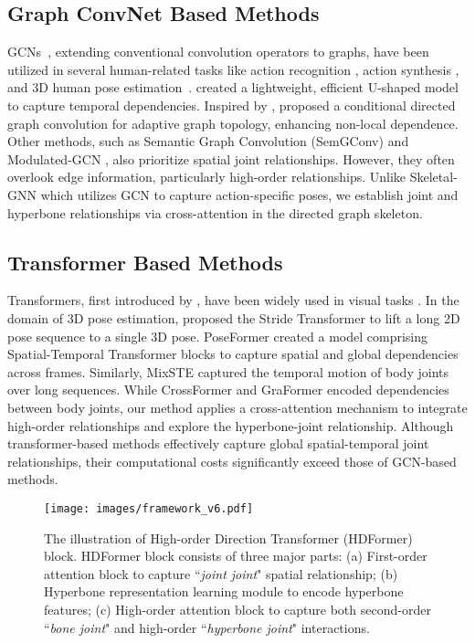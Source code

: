 \documentclass{article}
\begin{document}
\subsection{Graph ConvNet Based Methods}
GCNs~\cite{scarselli2008graph,gilmer2017neural}, extending conventional convolution operators to graphs, have been utilized in several human-related tasks like action recognition \cite{shi2019skeleton,shi2019-twostream,xiang2022language}, action synthesis \cite{yan2019convolutional}, and 3D human pose estimation~\cite{zhou2022hypergraph}. \cite{wang2020-motion} created a lightweight, efficient U-shaped model to capture temporal dependencies. Inspired by \cite{shi2019skeleton}, \cite{hu(2021)-conditional} proposed a conditional directed graph convolution for adaptive graph topology, enhancing non-local dependence. Other methods, such as Semantic Graph Convolution (SemGConv) \cite{zhao2019semantic} and Modulated-GCN \cite{zou2021-modulated}, also prioritize spatial joint relationships. However, they often overlook edge information, particularly high-order relationships. Unlike Skeletal-GNN \cite{zeng2021learning} which utilizes GCN to capture action-specific poses, we establish joint and hyperbone relationships via cross-attention in the directed graph skeleton.

\subsection{Transformer Based Methods}
Transformers, first introduced by \cite{vaswani2017attention}, have been widely used in visual tasks \cite{zhou2022hypergraph,tu2023implicit,cheng2022gsrformer}. In the domain of 3D pose estimation, \cite{li2022-exploiting} proposed the Stride Transformer to lift a long 2D pose sequence to a single 3D pose. PoseFormer \cite{zheng(2021)-poseformer} created a model comprising Spatial-Temporal Transformer blocks to capture spatial and global dependencies across frames. Similarly, MixSTE \cite{ZhangCVPR22MixSTE} captured the temporal motion of body joints over long sequences. While CrossFormer \cite{hassanin2022crossformer} and GraFormer \cite{zhao2022-graformer} encoded dependencies between body joints, our method applies a cross-attention mechanism to integrate high-order relationships and explore the hyperbone-joint relationship. Although transformer-based methods effectively capture global spatial-temporal joint relationships, their computational costs significantly exceed those of GCN-based methods.

\begin{figure*}[!t]
    \centering
\centerline{\texttt{[image: images/framework\_v6.pdf]}}
    \caption{\small The illustration of High-order Direction Transformer (HDFormer) block. HDFormer block consists of three major parts: (a) First-order attention block to capture ``\textit{joint joint}" spatial relationship; (b) Hyperbone representation learning module to encode hyperbone features; (c) High-order attention block to capture both second-order ``\textit{bone  joint}" and high-order ``\textit{hyperbone joint}" interactions. }
    \label{fig:higher order attention block}
\end{figure*}
\end{document}
